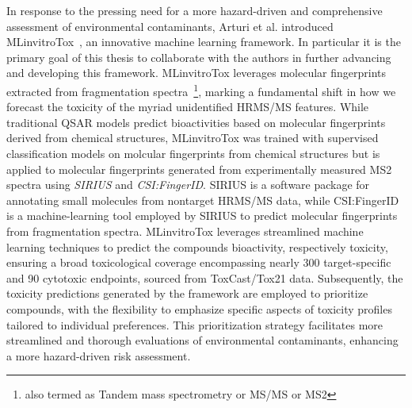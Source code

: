 In response to the pressing need for a more hazard-driven and comprehensive assessment of environmental contaminants, Arturi et al. introduced MLinvitroTox~\cite{arturi}, an innovative machine learning framework. In particular it is the primary goal of this thesis to collaborate with the authors in further advancing and developing this framework. MLinvitroTox leverages molecular fingerprints extracted from fragmentation spectra~\footnote{also termed as Tandem mass spectrometry or MS/MS or MS2}, marking a fundamental shift in how we forecast the toxicity of the myriad unidentified HRMS/MS features. While traditional QSAR models predict bioactivities based on molecular fingerprints derived from chemical structures, MLinvitroTox was trained with supervised classification models on molcular fingerprints from chemical structures but is applied to molecular fingerprints generated from experimentally measured MS2 spectra using \emph{SIRIUS} and \emph{CSI:FingerID}. SIRIUS is a software package for annotating small molecules from nontarget HRMS/MS data, while CSI:FingerID is a machine-learning tool employed by SIRIUS to predict molecular fingerprints from fragmentation spectra. MLinvitroTox leverages streamlined machine learning techniques to predict the compounds bioactivity, respectively toxicity, ensuring a broad toxicological coverage encompassing nearly 300 target-specific and 90 cytotoxic endpoints, sourced from ToxCast/Tox21 data. Subsequently, the toxicity predictions generated by the framework are employed to prioritize compounds, with the flexibility to emphasize specific aspects of toxicity profiles tailored to individual preferences. This prioritization strategy facilitates more streamlined and thorough evaluations of environmental contaminants, enhancing a more hazard-driven risk assessment.


